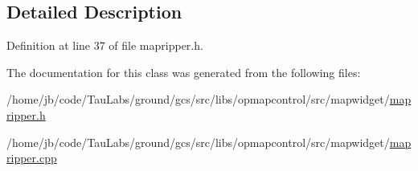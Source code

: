 \subsection{\-Detailed \-Description}


\-Definition at line 37 of file mapripper.\-h.



\-The documentation for this class was generated from the following files\-:\begin{DoxyCompactItemize}
\item 
/home/jb/code/\-Tau\-Labs/ground/gcs/src/libs/opmapcontrol/src/mapwidget/\hyperlink{mapripper_8h}{mapripper.\-h}\item 
/home/jb/code/\-Tau\-Labs/ground/gcs/src/libs/opmapcontrol/src/mapwidget/\hyperlink{mapripper_8cpp}{mapripper.\-cpp}\end{DoxyCompactItemize}
